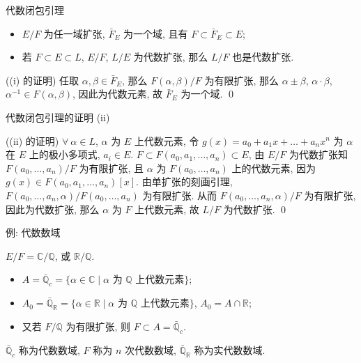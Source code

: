 
\begin{frame}{代数闭包引理}

\begin{lem}[代数闭包]
\begin{itemize}
\item[(i)] $E/F$ 为任一域扩张, $\bar{F}_E$ 为一个域, 且有
  $F \subset \bar{F}_E \subset E$;
\item[(ii)] 若 $F \subset E \subset L$, $E/F$, $L/E$ 为代数扩张,
  那么 $L/F$ 也是代数扩张.
\end{itemize}
\end{lem}

\startproof[bg=yellow, fg=red]((i) 的证明)
任取 $\alpha, \beta \in \bar{F}_E$, 那么 $F(\alpha, \beta)/F$ 为有限扩张,
那么 $\alpha \pm \beta$, $\alpha \cdot \beta$, $\alpha^{-1} \in F(\alpha, \beta)$,
因此为代数元素, 故 $\bar{F}_E$ 为一个域.
\qed

\end{frame}


\begin{frame}{代数闭包引理的证明 (ii)}

\startproof[bg=yellow, fg=red]((ii) 的证明)
$\forall\ \alpha \in L$, $\alpha$ 为 $E$ 上代数元素,
令 $g(x) = a_0 + a_1 x + \dots + a_n x^n$ 为 $\alpha$ 在 $E$ 上的极小多项式,
$a_i \in E$.
$F \subset F(a_0, a_1, \dots, a_n) \subset E$,
由 $E/F$ 为代数扩张知 $F(a_0, \dots, a_n)/F$ 为有限扩张,
且 $\alpha$ 为 $F(a_0, \dots, a_n)$ 上的代数元素,
因为 $g(x) \in F(a_0, a_1, \dots, a_n)[x]$.
由单扩张的刻画引理,
$F(a_0, \dots, a_n, \alpha)/F(a_0, \dots, a_n)$ 为有限扩张.
从而 $F(a_0, \dots, a_n, \alpha)/F$ 为有限扩张, 因此为代数扩张,
那么 $\alpha$ 为 $F$ 上代数元素, 故 $L/F$ 为代数扩张.
\qed

\end{frame}


\begin{frame}{例: 代数数域}

\begin{eg}
$E/F = \mathbb{C}/\mathbb{Q}$, 或 $\mathbb{R}/\mathbb{Q}$.
\begin{itemize}
\item $A = \bar{\mathbb{Q}}_c = \{ \alpha \in \mathbb{C} \mid
  \alpha \text{ 为 } \mathbb{Q} \text{ 上代数元素} \}$;
\item $A_0 = \bar{\mathbb{Q}}_{\mathbb{R}} = \{ \alpha \in \mathbb{R} \mid
  \alpha \text{ 为 } \mathbb{Q} \text{ 上代数元素} \}$,\quad
  $A_0 = A \cap \mathbb{R}$;
\item 又若 $F/\mathbb{Q}$ 为有限扩张, 则 $F \subset A = \bar{\mathbb{Q}}_c$.
\end{itemize}
$\bar{\mathbb{Q}}_c$ 称为代数数域, $F$ 称为 $n$ 次代数数域,
$\bar{\mathbb{Q}}_{\mathbb{R}}$ 称为实代数数域.
\end{eg}

\end{frame}

